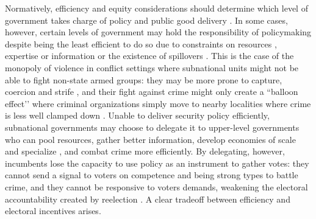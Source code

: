 \documentclass[12pt]{amsart}
\makeatletter
\def\section{\@startsection{section}{1}
	\z@{1.0\linespacing\@plus\linespacing}{.5\linespacing}{\Large}}
\numberwithin{equation}{section}
\theoremstyle{definition}
\theoremstyle{definition}
\theoremstyle{definition}
\makeatother
\begin{document}
\section{Introduction}
      
                    
Normatively, efficiency and equity considerations should determine which level of government takes charge of policy and public good delivery \citep{oates_1972, Musgrave_1959, Musgrave_1983, gramlich_1977}. In some cases, however, certain levels of government may hold the responsibility of policymaking despite being the least efficient to do so due to constraints on resources \citep{Moravcsik_2000}, expertise or information \citep{Rodrick_1996} or the existence of spillovers \citep{oates_1972,  Besley_case_1995}. This is the case of the monopoly of violence in conflict settings where subnational units might not be able to fight non-state armed groups: they may be more prone to capture, coercion and strife \citep{chacon_2018}, and their fight against crime might only create a ``balloon effect’’ where criminal organizations simply move to nearby localities where crime is less well clamped down \citep{shirk_wallman_2015}. Unable to deliver security policy efficiently, subnational governments may choose to delegate it to upper-level governments who can pool resources, gather better information, develop economies of scale and specialize \citep{Hawkins_etal_2006}, and combat crime more efficiently. By delegating, however, incumbents lose the capacity to use policy as an instrument to gather votes: they cannot send a signal to voters on competence and being strong types to battle crime, and they cannot be responsive to voters demands, weakening the electoral accountability created by reelection \citep{cox_katz_2002}. A clear tradeoff between efficiency and electoral incentives arises.    
     
\end{document}
